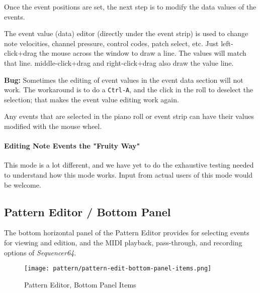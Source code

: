    Once the event positions are set, the next step is to modify the
   data values of the events.

	The event value (data) editor (directly under the event strip) is used 
	to change note velocities, channel pressure, control codes,
	patch select, etc.
   Just left-click+drag the mouse across the window to draw a line.  The
   values will match that line.  
   middle-click+drag and right-click+drag also
   draw the value line.

   \textbf{Bug:}
   Sometimes the editing of event values in the event data section will not work.
   The workaround is to do a \texttt{Ctrl-A}, and the click in the roll
   to deselect the selection; that makes the event value editing work again.
   
   Any events that are selected in the piano roll or event strip can have
   their values modified with the mouse wheel.

\paragraph{Editing Note Events the "Fruity Way"}
\label{paragraph:seq64_pattern_editor_note_events_fruity}

   This mode is a lot different, and we have yet to do the exhaustive testing
   needed to understand how this mode works.  Input from actual users of this
   mode would be welcome.

\subsection{Pattern Editor / Bottom Panel}
\label{subsec:seq64_pattern_editor_bottom}

   The bottom horizontal panel of the Pattern Editor provides for
   selecting events for viewing and edition, and the MIDI playback,
   pass-through, and recording options of \textsl{Sequencer64}.

\begin{figure}[H]
   \centering 
   \texttt{[image: pattern/pattern-edit-bottom-panel-items.png]}
   \caption{Pattern Editor, Bottom Panel Items}
   \label{fig:pattern_editor_bottom_panel_items}
\end{figure}

